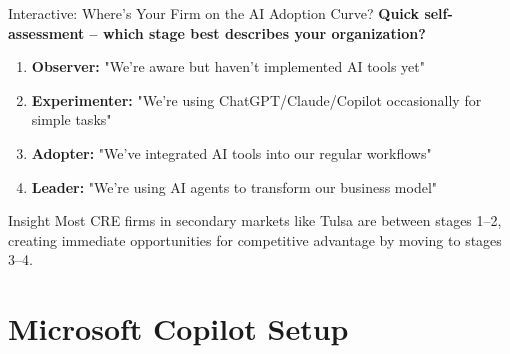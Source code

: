 \documentclass{beamer}
\begin{document}
\begin{frame}{Interactive: Where’s Your Firm on the AI Adoption Curve?}
  \textbf{Quick self-assessment – which stage best describes your organization?}
  \begin{enumerate}
    \item \textbf{Observer:} "We're aware but haven't implemented AI tools yet"
    \item \textbf{Experimenter:} "We're using ChatGPT/Claude/Copilot occasionally for simple tasks"
    \item \textbf{Adopter:} "We've integrated AI tools into our regular workflows"
    \item \textbf{Leader:} "We're using AI agents to transform our business model"
  \end{enumerate}

  \pause
  \begin{block}{Insight}
    Most CRE firms in secondary markets like Tulsa are between stages 1–2,
    creating immediate opportunities for competitive advantage by moving to
    stages 3–4.
  \end{block}
\end{frame}

\section{Microsoft Copilot Setup}
\end{document}
